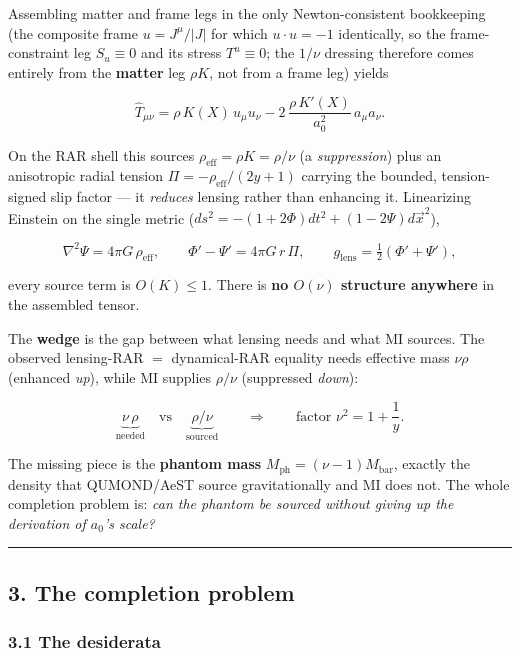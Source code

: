 \documentclass[
]{article}
\begin{document}
Assembling matter and frame legs in the only Newton-consistent
bookkeeping (the composite frame \(u=J^\mu/|J|\) for which
\(u\cdot u=-1\) identically, so the frame-constraint leg \(S_u\equiv0\)
and its stress \(T^u\equiv0\); the \(1/\nu\) dressing therefore comes
entirely from the \textbf{matter} leg \(\rho K\), not from a frame leg)
yields

\[
\hat T_{\mu\nu} = \rho\,K(X)\,u_\mu u_\nu - 2\,\frac{\rho\,K'(X)}{a_0^2}\,a_\mu a_\nu .
\]

On the RAR shell this sources \(\rho_\mathrm{eff}=\rho K=\rho/\nu\) (a
\emph{suppression}) plus an anisotropic radial tension
\(\Pi = -\rho_\mathrm{eff}/(2y+1)\) carrying the bounded, tension-signed
slip factor --- it \emph{reduces} lensing rather than enhancing it.
Linearizing Einstein on the single metric
(\(ds^2 = -(1+2\Phi)dt^2+(1-2\Psi)d\vec x^2\)),

\[
\nabla^2\Psi = 4\pi G\,\rho_\mathrm{eff}, \qquad \Phi'-\Psi' = 4\pi G\,r\,\Pi, \qquad g_\mathrm{lens}=\tfrac12(\Phi'+\Psi'),
\]

every source term is \(O(K)\le1\). There is \textbf{no \(O(\nu)\)
structure anywhere} in the assembled tensor.

The \textbf{wedge} is the gap between what lensing needs and what MI
sources. The observed lensing-RAR \(=\) dynamical-RAR equality needs
effective mass \(\nu\rho\) (enhanced \emph{up}), while MI supplies
\(\rho/\nu\) (suppressed \emph{down}):

\[
\underbrace{\nu\,\rho}_{\text{needed}} \quad\text{vs}\quad \underbrace{\rho/\nu}_{\text{sourced}} \qquad\Longrightarrow\qquad \text{factor } \nu^2 = 1+\frac{1}{y}.
\]

The missing piece is the \textbf{phantom mass}
\(M_\mathrm{ph}=(\nu-1)M_\mathrm{bar}\), exactly the density that QUMOND/AeST
source gravitationally and MI does not. The whole completion problem is:
\emph{can the phantom be sourced without giving up the derivation of
\(a_0\)'s scale?}

\begin{center}\rule{0.5\linewidth}{0.5pt}\end{center}

\subsection{3. The completion problem}\label{the-completion-problem}

\subsubsection{3.1 The desiderata}\label{the-desiderata}
\end{document}
